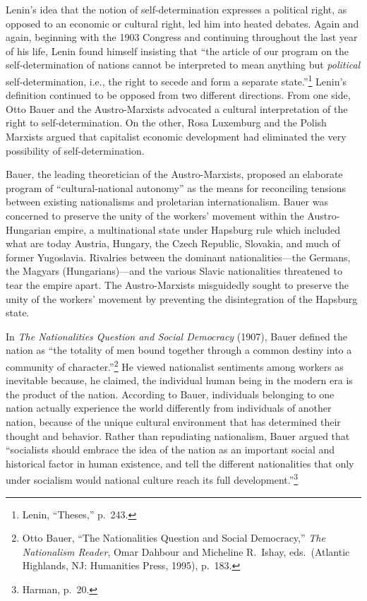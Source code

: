 Lenin's idea that the notion of self-determination expresses a political right, as opposed to an economic or cultural right, led him into heated debates. Again and again, beginning with the 1903 Congress and continuing throughout the last year of his life, Lenin found himself insisting that ``the article of our program on the self-determination of nations cannot be interpreted to mean anything but \emph{political} self-determination, i.e., the right to secede and form a separate state.''\footnote{Lenin, ``Theses,'' p.\ 243.} Lenin's definition continued to be opposed from two different directions. From one side, Otto Bauer and the Austro-Marxists advocated a cultural interpretation of the right to self-determination. On the other, Rosa Luxemburg and the Polish Marxists argued that capitalist economic development had eliminated the very possibility of self-determination.

Bauer, the leading theoretician of the Austro-Marxists, proposed an elaborate program of ``cultural-national autonomy'' as the means for reconciling tensions between existing nationalisms and proletarian internationalism. Bauer was concerned to preserve the unity of the workers' movement within the Austro-Hungarian empire, a multinational state under Hapsburg rule which included what are today Austria, Hungary, the Czech Republic, Slovakia, and much of former Yugoslavia. Rivalries between the dominant nationalities---the Germans, the Magyars (Hungarians)---and the various Slavic nationalities threatened to tear the empire apart. The Austro-Marxists misguidedly sought to preserve the unity of the workers' movement by preventing the disintegration of the Hapsburg state.

In \emph{The Nationalities Question and Social Democracy} (1907), Bauer defined the nation as ``the totality of men bound together through a common destiny into a community of character.''\footnote{Otto Bauer, ``The Nationalities Question and Social Democracy,'' \emph{The Nationalism Reader}, Omar Dahbour and Micheline R.\ Ishay, eds.\ (Atlantic Highlands, NJ: Humanities Press, 1995), p.\ 183.} He viewed nationalist sentiments among workers as inevitable because, he claimed, the individual human being in the modern era is the product of the nation. According to Bauer, individuals belonging to one nation actually experience the world differently from individuals of another nation, because of the unique cultural environment that has determined their thought and behavior. Rather than repudiating nationalism, Bauer argued that ``socialists should embrace the idea of the nation as an important social and historical factor in human existence, and tell the different nationalities that only under socialism would national culture reach its full development.''\footnote{Harman, p.\ 20.}

